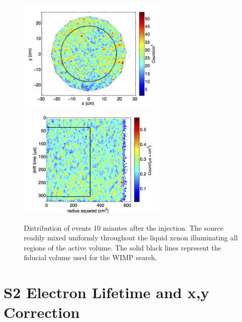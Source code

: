 \begin{figure}[h!]\centering
\includegraphics[width=72mm]{Chapter_XYZ_Corr/Thesis_Corr_Plots/Kr_XY_density.png}
\includegraphics[width=72mm]{Chapter_XYZ_Corr/Thesis_Corr_Plots/Kr_RZ_density.png}
\caption{Distribution of \KrCal events 10 minutes after the injection. The source readily mixed uniformly throughout the liquid xenon illuminating all regions of the active volume. The solid black lines represent the fiducial volume used for the WIMP search. }
\label{fig:Kr_Dist}
\end{figure}




\section{S2 Electron Lifetime and x,y Correction}


